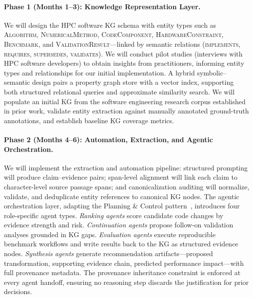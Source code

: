 \documentclass{files/proposalnsf}
\begin{document}
\paragraph{Phase 1 (Months 1--3): Knowledge Representation Layer.}
We will design the HPC software KG schema with entity types such as \textsc{Algorithm}, \textsc{NumericalMethod}, \textsc{CodeComponent}, \textsc{HardwareConstraint}, \textsc{Benchmark}, and \textsc{ValidationResult}---linked by semantic relations (\textsc{implements}, \textsc{requires}, \textsc{supersedes}, \textsc{validates}). We will conduct pilot studies (\eg interviews with HPC software developers) to obtain insights from practitioners, informing entity types and relationships for our initial implementation. A hybrid symbolic--semantic design pairs a property graph store with a vector index, supporting both structured relational queries and approximate similarity search. We will populate an initial KG from the software engineering research corpus established in prior work, validate entity extraction against manually annotated ground-truth annotations, and establish baseline KG coverage metrics.

\paragraph{Phase 2 (Months 4--6): Automation, Extraction, and Agentic Orchestration.}
We will implement the extraction and automation pipeline: structured prompting will produce claim--evidence pairs; span-level alignment will link each claim to character-level source passage spans; and canonicalization auditing will normalize, validate, and deduplicate entity references to canonical KG nodes. The agentic orchestration layer, adapting the Planning \& Control pattern~\cite{Park2023GenerativeAgents}, introduces four role-specific agent types. \textit{Ranking agents} score candidate code changes by evidence strength and risk. \textit{Continuation agents} propose follow-on validation analyses grounded in KG gaps. \textit{Evaluation agents} execute reproducible benchmark workflows and write results back to the KG as structured evidence nodes. \textit{Synthesis agents} generate recommendation artifacts---proposed transformation, supporting evidence chain, predicted performance impact---with full provenance metadata. The provenance inheritance constraint is enforced at every agent handoff, ensuring no reasoning step discards the justification for prior decisions.
\end{document}
